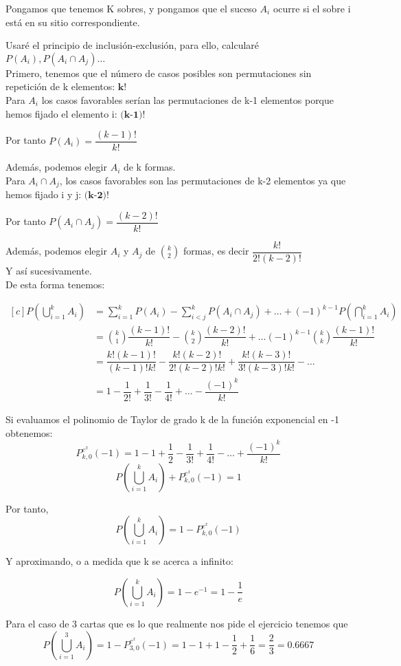 \problem
Pongamos que tenemos K sobres, y pongamos que el suceso $A_i$ ocurre si el sobre i está en su sitio correspondiente.

Usaré el principio de inclusión-exclusión, para ello, calcularé $P(A_i), P(A_i\cap A_j) \dots$ \\

Primero, tenemos que el número de casos posibles son permutaciones sin repetición de k elementos: $\textbf{k!}$ \\

Para $A_i$ los casos favorables serían las permutaciones de k-1 elementos porque hemos fijado el elemento i: $\textbf{(k-1)!}$

Por tanto $P(A_i) = \dfrac{(k-1)!}{k!}$ 

Además, podemos elegir $A_i$ de k formas.\\

Para $A_i \cap A_j$, los casos favorables son las permutaciones de k-2 elementos ya que hemos fijado i y j: $\textbf{(k-2)!}$

Por tanto $P(A_i \cap A_j) = \dfrac{(k-2)!}{k!}$

Además, podemos elegir $A_i$ y $A_j$ de $k \choose 2$ formas, es decir  $\dfrac{k!}{2!(k-2)!}$ \\

Y así sucesivamente.\\

De esta forma tenemos:

\begin{equation}
\begin{aligned}[c]
    P(\bigcup_{i=1}^k A_i) & = \sum_{i=1}^k P(A_i) - \sum_{i<j}^k P(A_i \cap A_j) + \dots + (-1)^{k-1}P(\bigcap_{i=1}^k A_i) \\
    & = {k \choose 1} \dfrac{(k-1)!}{k!} - {k \choose 2} \dfrac{(k-2)!}{k!} + \dots (-1)^{k-1} {k \choose k}\dfrac{(k-1)!}{k!}\\
    & = \dfrac{k!(k-1)!}{(k-1)!k!} - \dfrac{k!(k-2)!}{2!(k-2)!k!} + \dfrac{k!(k-3)!}{3!(k-3)!k!} - \dots \\
    & = 1- \dfrac{1}{2!} + \dfrac{1}{3!} - \dfrac{1}{4!} + \dots - \dfrac{(-1)^{k}}{k!}
\end{aligned}
\end{equation}

Si evaluamos el polinomio de Taylor de grado k de la función exponencial en -1 obtenemos:
$$ P_{k,0}^{e^x} (-1)= 1 - 1 + \dfrac{1}{2} - \dfrac{1}{3!}+ \dfrac{1}{4!} - \dots + \dfrac{(-1)^{k}}{k!}$$
$$ P(\bigcup_{i=1}^k A_i) + P_{k,0}^{e^x} (-1) = 1$$

Por tanto, 
$$ P(\bigcup_{i=1}^k A_i) = 1 - P_{k,0}^{e^x} (-1)$$

Y aproximando, o a medida que k se acerca a infinito:

$$ P(\bigcup_{i=1}^k A_i) = 1 - e^{-1} = 1 - \dfrac{1}{e}$$


Para el caso de 3 cartas que es lo que realmente nos pide el ejercicio tenemos que 
$$ P(\bigcup_{i=1}^3 A_i) = 1 - P_{3,0}^{e^x} (-1) = 1 - 1 + 1 - \dfrac{1}{2} + \dfrac{1}{6} = \dfrac{2}{3} = 0.6667$$
